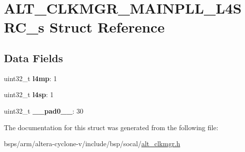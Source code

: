\hypertarget{structALT__CLKMGR__MAINPLL__L4SRC__s}{}\section{A\+L\+T\+\_\+\+C\+L\+K\+M\+G\+R\+\_\+\+M\+A\+I\+N\+P\+L\+L\+\_\+\+L4\+S\+R\+C\+\_\+s Struct Reference}
\label{structALT__CLKMGR__MAINPLL__L4SRC__s}
\subsection*{Data Fields}
\begin{DoxyCompactItemize}
\item 
\mbox{\label{structALT__CLKMGR__MAINPLL__L4SRC__s_abbb8709bf3bbbd2be40df29677ce7dc6}} 
uint32\+\_\+t {\bfseries l4mp}\+: 1
\item 
\mbox{\label{structALT__CLKMGR__MAINPLL__L4SRC__s_a3020f6752dc7ac11468cff31dce47866}} 
uint32\+\_\+t {\bfseries l4sp}\+: 1
\item 
\mbox{\label{structALT__CLKMGR__MAINPLL__L4SRC__s_a15ceb0106916ea1cf48c6e06a92d314c}} 
uint32\+\_\+t {\bfseries \+\_\+\+\_\+pad0\+\_\+\+\_\+}\+: 30
\end{DoxyCompactItemize}


The documentation for this struct was generated from the following file\+:\begin{DoxyCompactItemize}
\item 
bsps/arm/altera-\/cyclone-\/v/include/bsp/socal/\mbox{\hyperlink{alt__clkmgr_8h}{alt\+\_\+clkmgr.\+h}}\end{DoxyCompactItemize}
